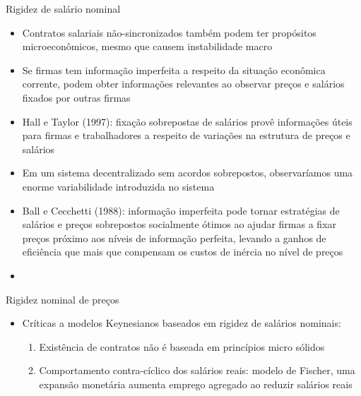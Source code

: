 \documentclass[10pt]{beamer}
\begin{document}
\begin{frame}{Rigidez de salário nominal}
    \begin{itemize}
        \item Contratos salariais não-sincronizados também podem ter propósitos microeconômicos, mesmo que causem instabilidade macro\bigskip
        \item Se firmas tem informação imperfeita a respeito da situação econômica corrente, podem obter informações relevantes ao observar preços e salários fixados por outras firmas\bigskip
        \item Hall e Taylor (1997): fixação sobrepostas de salários provê informações úteis para firmas e trabalhadores a respeito de variações na estrutura de preços e salários\bigskip
        \item Em um sistema decentralizado sem acordos sobrepostos, observaríamos uma enorme variabilidade introduzida no sistema\bigskip
        \item Ball e Cecchetti (1988): informação imperfeita pode tornar estratégias de salários e preços sobrepostos socialmente ótimos ao ajudar firmas a fixar preços próximo aos níveis de informação perfeita, levando a ganhos de eficiência que mais que compensam os custos de inércia no nível de preços\bigskip
        \item {} 
    \end{itemize}
\end{frame}

\begin{frame}{Rigidez nominal de preços}
    \begin{itemize}
        \item Críticas a modelos Keynesianos baseados em rigidez de salários nominais:\bigskip
        \begin{enumerate}
            \item Existência de contratos não é baseada em princípios micro sólidos\bigskip
            \item Comportamento contra-cíclico dos salários reais: modelo de Fischer, uma expansão monetária aumenta emprego agregado ao reduzir salários reais\bigskip
        \end{enumerate}        
    \end{itemize}
\end{frame}
\end{document}
